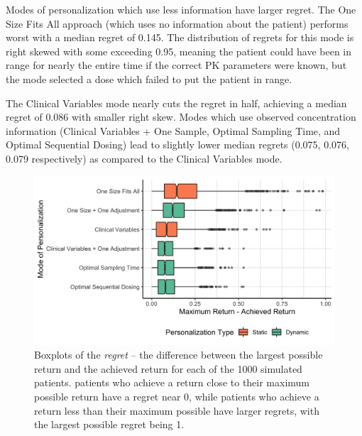 Modes of personalization which use less information have larger regret.  The One Size Fits All approach (which uses no information about the patient) performs worst with a median regret of 0.145.  The distribution of regrets for this mode is right skewed with some exceeding 0.95, meaning the patient could have been in range for nearly the entire time if the correct PK parameters were known, but the mode selected a dose which failed to put the patient in range. 

The Clinical Variables mode nearly cuts the regret in half, achieving a median regret of 0.086 with smaller right skew.  Modes which use observed concentration information (Clinical Variables + One Sample, Optimal Sampling Time, and Optimal Sequential Dosing) lead to slightly lower median regrets  (0.075, 0.076, 0.079 respectively) as compared to the Clinical Variables mode.

\begin{figure}
	\centering
	\includegraphics[width=1\linewidth]{figures/models_of_personalization_differences}
	\caption{Boxplots of the \textit{regret} -- the difference between the largest possible return and the achieved return for each of the 1000 simulated patients. patients who achieve a return close to their maximum possible return have a regret near 0, while patients who achieve a return less than their maximum possible have larger regrets, with the largest possible regret being 1.}
	\label{fig:modelsofpersonalizationdifferences}
\end{figure}
